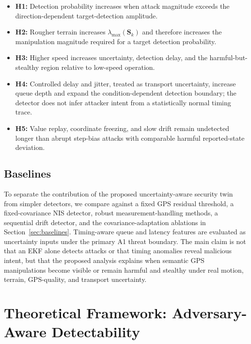 \documentclass[11pt,a4paper]{article}
\begin{document}
\begin{itemize}
    \item \textbf{H1:} Detection probability increases when attack magnitude
    exceeds the direction-dependent target-detection amplitude.
    \item \textbf{H2:} Rougher terrain increases
    $\lambda_{\max}(\mathbf{S}_k)$ and therefore increases the manipulation
    magnitude required for a target detection probability.
    \item \textbf{H3:} Higher speed increases uncertainty, detection delay, and
    the harmful-but-stealthy region relative to low-speed operation.
    \item \textbf{H4:} Controlled delay and jitter, treated as transport
    uncertainty, increase queue depth and expand the condition-dependent
    detection boundary; the detector does not infer attacker intent from a
    statistically normal timing trace.
    \item \textbf{H5:} Value replay, coordinate freezing, and slow drift remain
    undetected longer than abrupt step-bias attacks with comparable harmful
    reported-state deviation.
\end{itemize}

\subsection{Baselines}

To separate the contribution of the proposed uncertainty-aware security twin
from simpler detectors, we compare against a fixed GPS residual threshold, a
fixed-covariance NIS detector, robust measurement-handling methods, a
sequential drift detector, and the covariance-adaptation ablations in
Section~\ref{sec:baselines}. Timing-aware queue and latency features are
evaluated as uncertainty inputs under the primary A1 threat boundary. The main
claim is not that an EKF alone detects attacks or that timing anomalies reveal
malicious intent, but that the proposed analysis explains when semantic GPS
manipulations become visible or remain harmful and stealthy under real motion,
terrain, GPS-quality, and transport uncertainty.

\section{Theoretical Framework: Adversary-Aware Detectability}
\end{document}
